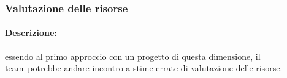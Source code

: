 \documentclass[../PianoProgetto.tex]{subfiles}
\begin{document}
\subsubsection{Valutazione delle risorse}
\label{sec:Valutazione delle risorse}

	\paragraph*{Descrizione:} essendo al primo approccio con un progetto di questa dimensione, il team\g\ potrebbe andare incontro a stime errate di valutazione delle risorse.
	
	
\end{document}
